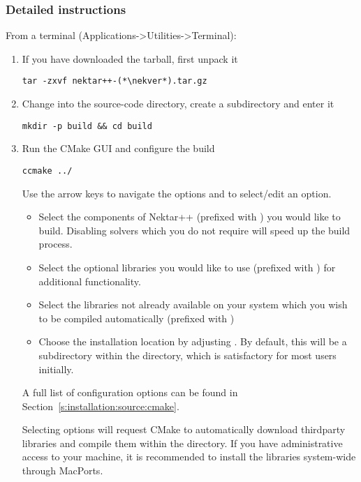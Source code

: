 \subsubsection{Detailed instructions}
From a terminal (Applications->Utilities->Terminal):
\begin{enumerate}
    \item If you have downloaded the tarball, first unpack it
    \begin{lstlisting}[style=BashInputStyle]
tar -zxvf nektar++-(*\nekver*).tar.gz
    \end{lstlisting}

    \item Change into the source-code directory, create a 
    subdirectory and enter it
    \begin{lstlisting}[style=BashInputStyle]
    mkdir -p build && cd build
    \end{lstlisting}

    \item Run the CMake GUI and configure the build
    \begin{lstlisting}[style=BashInputStyle]
    ccmake ../
    \end{lstlisting}
    Use the arrow keys to navigate the options and  to select/edit
    an option.
    \begin{itemize}
        \item Select the components of Nektar++ (prefixed with
        ) you would like to build. Disabling solvers
        which you do not require will speed up the build process.
        \item Select the optional libraries you would like to use (prefixed with
        ) for additional functionality.
        \item Select the libraries not already available on your system which
        you wish to be compiled automatically (prefixed with
        )
        \item Choose the installation location by adjusting . By default, this will be a  subdirectory within the  directory, which is satisfactory for most users initially.
    \end{itemize}
    A full list of configuration options can be found in
    Section~\ref{s:installation:source:cmake}.

    \begin{notebox}
    Selecting  options will request CMake to
    automatically download thirdparty libraries and compile them within the
    \nekpp directory. If you have administrative access to your machine, it is
    recommended to install the libraries system-wide through MacPorts.
    \end{notebox}


\end{enumerate}
